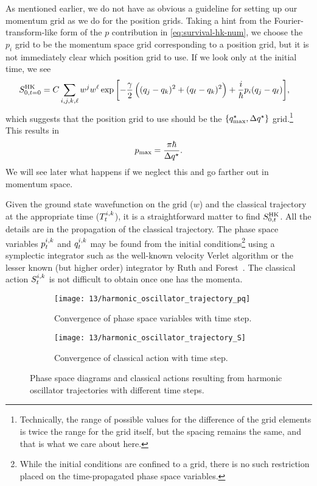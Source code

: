 As mentioned earlier, we do not have as obvious a guideline for setting up our momentum grid as we do for the position grids.
Taking a hint from the Fourier-transform-like form of the $p$ contribution in \cref{eq:survival-hk-num}, we choose the $p_i$ grid to be the momentum space grid corresponding to a position grid, but it is not immediately clear which position grid to use.
If we look only at the initial time, we see
\begin{align}
	S_{0,t=0}^\mathrm{HK}
	&= C \sum_{i,j,k,\ell}
			w^j w^\ell
			\exp{\left[ 
				-\frac{\gamma}{2} \left( (q_j - q_k)^2 + (q_\ell - q_k)^2 \right)
				+ \frac{i}{\hbar} p_i (q_j - q_\ell)
			 \right]},
\end{align}
which suggests that the position grid to use should be the $\{ q_\mathrm{max}^\star, \Delta q^\star \}$ grid.\footnote{
	Technically, the range of possible values for the difference of the grid elements is twice the range for the grid itself, but the spacing remains the same, and that is what we care about here.
}
This results in~\cite{fattal1996phase}
\begin{align}
	p_\mathrm{max}
	= \frac{\pi \hbar}{\Delta q^\star}.
		\label{eq:hk-pmax}
\end{align}
We will see later what happens if we neglect this and go farther out in momentum space.

Given the ground state wavefunction on the grid ($w$) and the classical trajectory at the appropriate time ($T^{i,k}_t$), it is a straightforward matter to find $S_{0,t}^\mathrm{HK}$.
All the details are in the propagation of the classical trajectory.
The phase space variables $p^{i,k}_t$ and $q^{i,k}_t$ may be found from the initial conditions\footnote{
	While the initial conditions are confined to a grid, there is no such restriction placed on the time-propagated phase space variables.
} using a symplectic integrator such as the well-known velocity Verlet algorithm or the lesser known (but higher order) integrator by Ruth and Forest~\cite{forest1990fourth}.
The classical action $S^{i,k}_t$ is not difficult to obtain once one has the momenta.

\begin{figure}
	\setlength{\figspacing}{5 mm}
	\centering
	\begin{subfigure}[b]{\textwidth}
		\texttt{[image: 13/harmonic\_oscillator\_trajectory\_pq]}
		\caption{
			Convergence of phase space variables with time step.
		}
		\vspace{\figspacing}
	\end{subfigure}
	\begin{subfigure}[b]{\textwidth}
		\texttt{[image: 13/harmonic\_oscillator\_trajectory\_S]}
		\caption{
			Convergence of classical action with time step.
		}
	\end{subfigure}
	\caption[
		Example classical trajectories for harmonic oscillator
	]{
		Phase space diagrams and classical actions resulting from harmonic oscillator trajectories with different time steps.
		\explainplotsas{}
	}
	\label{fig:harmonic-oscillator-trajectory-a}
\end{figure}

